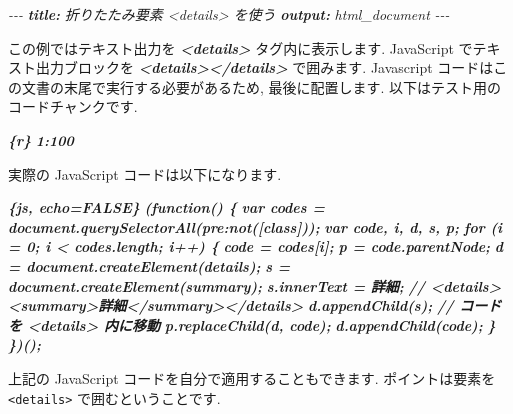 \documentclass[
  11pt,
  lualatex,ja=standard,jafont=noto]{bxjsreport}
\newenvironment{Shaded}{\begin{snugshade}}{\end{snugshade}}
\newcommand{\AnnotationTok}[1]{\textcolor[rgb]{0.56,0.35,0.01}{\textbf{\textit{#1}}}}
\newcommand{\CommentTok}[1]{\textcolor[rgb]{0.56,0.35,0.01}{\textit{#1}}}
\newcommand{\InformationTok}[1]{\textcolor[rgb]{0.56,0.35,0.01}{\textbf{\textit{#1}}}}
\newcommand{\NormalTok}[1]{#1}
\begin{document}
\begin{Shaded}
\begin{Highlighting}[]
\CommentTok{{-}{-}{-}}
\AnnotationTok{title:}\CommentTok{ 折りたたみ要素 \textasciigrave{}\textless{}details\textgreater{}\textasciigrave{} を使う}
\AnnotationTok{output:}\CommentTok{ html\_document}
\CommentTok{{-}{-}{-}}

\NormalTok{この例ではテキスト出力を }\InformationTok{\textasciigrave{}\textless{}details\textgreater{}\textasciigrave{}}\NormalTok{ タグ内に表示します.}
\NormalTok{JavaScript でテキスト出力ブロックを }\InformationTok{\textasciigrave{}\textless{}details\textgreater{}\textless{}/details\textgreater{}\textasciigrave{}}\NormalTok{ で囲みます.}
\NormalTok{Javascript コードはこの文書の末尾で実行する必要があるため,}
\NormalTok{最後に配置します. 以下はテスト用のコードチャンクです.}

\InformationTok{\textasciigrave{}\textasciigrave{}\textasciigrave{}\{r\}}
\InformationTok{1:100}
\InformationTok{\textasciigrave{}\textasciigrave{}\textasciigrave{}}

\NormalTok{実際の JavaScript コードは以下になります.}

\InformationTok{\textasciigrave{}\textasciigrave{}\textasciigrave{}\{js, echo=FALSE\}}
\InformationTok{(function() \{}
\InformationTok{  var codes = document.querySelectorAll(\textquotesingle{}pre:not([class])\textquotesingle{});}
\InformationTok{  var code, i, d, s, p;}
\InformationTok{  for (i = 0; i \textless{} codes.length; i++) \{}
\InformationTok{    code = codes[i];}
\InformationTok{    p = code.parentNode;}
\InformationTok{    d = document.createElement(\textquotesingle{}details\textquotesingle{});}
\InformationTok{    s = document.createElement(\textquotesingle{}summary\textquotesingle{});}
\InformationTok{    s.innerText = \textquotesingle{}詳細\textquotesingle{};}
\InformationTok{    // \textless{}details\textgreater{}\textless{}summary\textgreater{}詳細\textless{}/summary\textgreater{}\textless{}/details\textgreater{}}
\InformationTok{    d.appendChild(s);}
\InformationTok{    // コードを \textless{}details\textgreater{} 内に移動}
\InformationTok{    p.replaceChild(d, code);}
\InformationTok{    d.appendChild(code);}
\InformationTok{  \}}
\InformationTok{\})();}
\InformationTok{\textasciigrave{}\textasciigrave{}\textasciigrave{}}
\end{Highlighting}
\end{Shaded}

上記の JavaScript コードを自分で適用することもできます. ポイントは要素を \texttt{\textless{}details\textgreater{}} で囲むということです.
\end{document}
